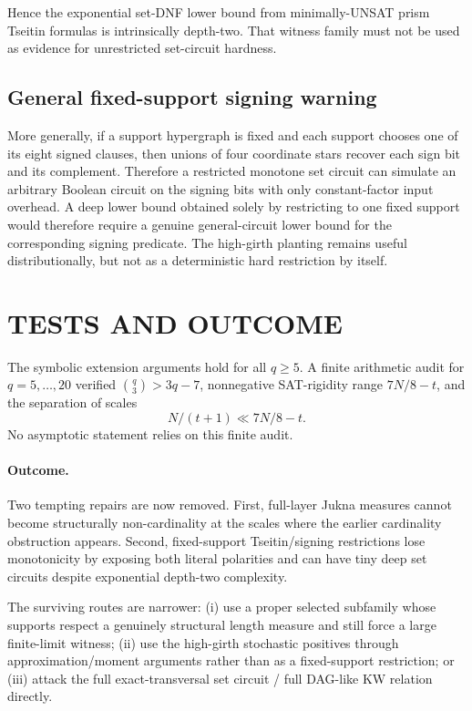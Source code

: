 \documentclass[11pt]{article}
\begin{document}
Hence the exponential set-DNF lower bound from minimally-UNSAT prism Tseitin formulas is intrinsically depth-two. That witness family must not be used as evidence for unrestricted set-circuit hardness.

\subsection{General fixed-support signing warning}
More generally, if a support hypergraph is fixed and each support chooses one of its eight signed clauses, then unions of four coordinate stars recover each sign bit and its complement. Therefore a restricted monotone set circuit can simulate an arbitrary Boolean circuit on the signing bits with only constant-factor input overhead. A deep lower bound obtained solely by restricting to one fixed support would therefore require a genuine general-circuit lower bound for the corresponding signing predicate. The high-girth planting remains useful distributionally, but not as a deterministic hard restriction by itself.

\section{TESTS AND OUTCOME}
The symbolic extension arguments hold for all $q\ge5$. A finite arithmetic audit for $q=5,\ldots,20$ verified $\binom q3>3q-7$, nonnegative SAT-rigidity range $7N/8-t$, and the separation of scales
\[N/(t+1)\ll7N/8-t.\]
No asymptotic statement relies on this finite audit.

\paragraph{Outcome.}
Two tempting repairs are now removed. First, full-layer Jukna measures cannot become structurally non-cardinality at the scales where the earlier cardinality obstruction appears. Second, fixed-support Tseitin/signing restrictions lose monotonicity by exposing both literal polarities and can have tiny deep set circuits despite exponential depth-two complexity.

The surviving routes are narrower: (i) use a proper selected subfamily whose supports respect a genuinely structural length measure and still force a large finite-limit witness; (ii) use the high-girth stochastic positives through approximation/moment arguments rather than as a fixed-support restriction; or (iii) attack the full exact-transversal set circuit / full DAG-like KW relation directly.
\end{document}
